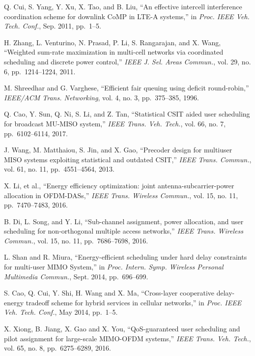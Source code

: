 \documentclass[conference]{IEEEtran}
\begin{document}
\begin{thebibliography}{10}
  Q. Cui, S. Yang, Y. Xu, X. Tao, and B. Liu, ``An effective intercell interference coordination scheme for downlink CoMP in LTE-A
  systems,'' in
  \emph{Proc. IEEE Veh. Tech. Conf.}, Sep. 2011, pp.~1--5.
  
  H. Zhang, L. Venturino, N. Prasad, P. Li, S. Rangarajan, and X. Wang, ``Weighted sum-rate maximization in multi-cell networks via coordinated scheduling and discrete power control,''
  \emph{IEEE J. Sel. Areas Commun.}, vol. 29, no. 6, pp.~1214--1224, 2011.
  
  
  M. Shreedhar and G. Varghese, ``Efficient fair queuing using deficit round-robin,''
  \emph{IEEE/ACM Trans. Networking}, vol. 4, no. 3, pp.~375--385, 1996.
  
  Q. Cao, Y. Sun, Q. Ni, S. Li, and Z. Tan, ``Statistical CSIT aided user scheduling for broadcast MU-MISO system,''
  \emph{IEEE Trans. Veh. Tech.}, vol. 66, no. 7, pp.~6102--6114, 2017.
  
  J. Wang, M. Matthaiou, S. Jin, and X. Gao, ``Precoder design for multiuser MISO systems exploiting statistical and outdated CSIT,''
  \emph{IEEE Trans. Commun.}, vol. 61, no. 11, pp.~4551--4564, 2013.
  
  X. Li, et al., ``Energy efficiency optimization: joint antenna-subcarrier-power allocation in OFDM-DASs,''
  \emph{IEEE Trans. Wireless Commun.}, vol. 15, no. 11, pp.~7470--7483, 2016.
  
  B. Di, L. Song, and Y. Li, ``Sub-channel assignment, power allocation, and user scheduling for non-orthogonal multiple access networks,''
  \emph{IEEE Trans. Wireless Commun.}, vol. 15, no. 11, pp.~7686--7698, 2016.
  
  L. Shan and R. Miura, ``Energy-efficient scheduling under hard delay constraints for multi-user MIMO System,'' in
  \emph{Proc. Intern. Symp. Wireless Personal Multimedia Commun.}, Sept. 2014, pp.~696--699.
  
  S. Cao, Q. Cui, Y. Shi, H. Wang and X. Ma, ``Cross-layer cooperative delay-energy tradeoff scheme for hybrid services in cellular networks,'' in
  \emph{Proc. IEEE Veh. Tech. Conf.}, May 2014, pp.~1--5.
  
  X. Xiong, B. Jiang, X. Gao and X. You, ``QoS-guaranteed user scheduling and pilot assignment for large-scale MIMO-OFDM systems,''
  \emph{IEEE Trans. Veh. Tech.}, vol. 65, no. 8, pp.~6275--6289, 2016.
  

\end{thebibliography}
\end{document}
